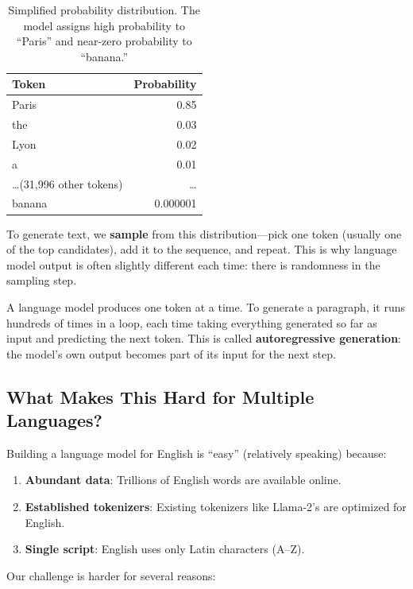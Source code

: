 \documentclass[11pt,a4paper]{article}
\begin{document}
\begin{table}[H]
\centering
\begin{tabular}{lr}
\toprule
\textbf{Token} & \textbf{Probability} \\
\midrule
Paris & 0.85 \\
the & 0.03 \\
Lyon & 0.02 \\
a & 0.01 \\
\ldots (31,996 other tokens) & \ldots \\
banana & 0.000001 \\
\bottomrule
\end{tabular}
\caption{Simplified probability distribution. The model assigns high probability to ``Paris'' and near-zero probability to ``banana.''}
\end{table}

To generate text, we \textbf{sample} from this distribution---pick one token (usually one of the top candidates), add it to the sequence, and repeat. This is why language model output is often slightly different each time: there is randomness in the sampling step.

\begin{keyidea}
A language model produces one token at a time. To generate a paragraph, it runs hundreds of times in a loop, each time taking everything generated so far as input and predicting the next token. This is called \textbf{autoregressive generation}: the model's own output becomes part of its input for the next step.
\end{keyidea}

\subsection{What Makes This Hard for Multiple Languages?}

Building a language model for English is ``easy'' (relatively speaking) because:

\begin{enumerate}
    \item \textbf{Abundant data}: Trillions of English words are available online.
    \item \textbf{Established tokenizers}: Existing tokenizers like Llama-2's are optimized for English.
    \item \textbf{Single script}: English uses only Latin characters (A--Z).
\end{enumerate}

Our challenge is harder for several reasons:
\end{document}
